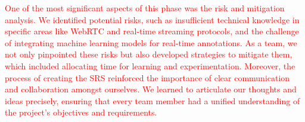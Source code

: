 \documentclass[12pt]{article}
\begin{document}
\textcolor{red}{One of the most significant aspects of this phase was the risk and mitigation analysis. We identified potential 
risks, such as insufficient technical knowledge in specific areas like WebRTC and real-time streaming protocols, and the 
challenge of integrating machine learning models for real-time annotations. As a team, we not only pinpointed these risks 
but also developed strategies to mitigate them, which included allocating time for learning and experimentation. Moreover, 
the process of creating the SRS reinforced the importance of clear communication and collaboration amongst ourselves. We learned 
to articulate our thoughts and ideas precisely, ensuring that every team member had a unified understanding of the project's 
objectives and requirements.}

\printbibliography
\end{document}
